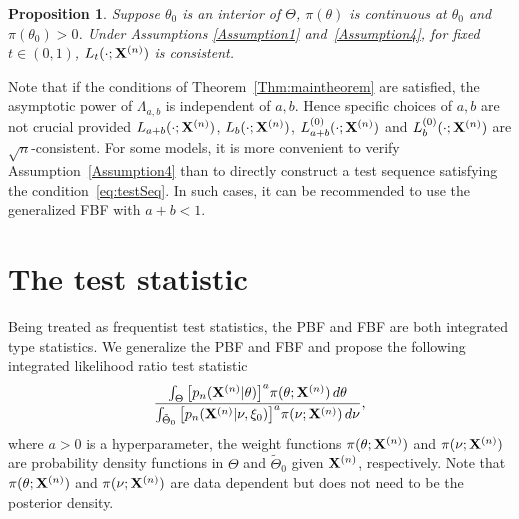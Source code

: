 \documentclass[11pt]{article}
\theoremstyle{plain}
\newtheorem{proposition}{\quad\quad Proposition}
\theoremstyle{definition}
\theoremstyle{remark}
\begin{document}
\begin{proposition}\label{Theoremless1}
    Suppose $\theta_0$ is an interior of $\Theta$, $\pi(\theta)$ is continuous at $\theta_0$ and $\pi(\theta_0)>0$.
    Under Assumptions \ref{Assumption1} and~\ref{Assumption4}, for fixed $t\in(0,1)$, $L_t(\cdot;\mathbf{X}^{(n)})$ is consistent.
\end{proposition}
Note that if the conditions of Theorem~\ref{Thm:maintheorem} are satisfied, the asymptotic power of $\Lambda_{a,b}$ is independent of $a,b$.
Hence specific choices of $a,b$ are not crucial provided $L_{a+b}(\cdot;\mathbf{X}^{(n)})$, $L_b(\cdot;\mathbf{X}^{(n)})$, $L^{(0)}_{a+b}(\cdot;\mathbf{X}^{(n)})$ and $L^{(0)}_b(\cdot;\mathbf{X}^{(n)})$ are $\sqrt{n}$-consistent.
For some models, it is more convenient to verify Assumption~\ref{Assumption4} than to directly construct a test sequence satisfying the condition~\eqref{eq:testSeq}.
In such cases, it can be recommended to use the generalized FBF with $a+b< 1$.




\section{The test statistic}


 Being treated as frequentist test statistics, the PBF and FBF are both integrated type statistics.
 We generalize the PBF and FBF and propose the following integrated likelihood ratio test statistic
\begin{equation*}
    \frac{\int_{\Theta} \big[p_n(\mathbf{X}^{(n)}|\theta)\big]^{a}\pi(\theta;\mathbf{X}^{(n)})\,d\theta}{\int_{\tilde{\Theta}_0} \big[p_n(\mathbf{X}^{(n)}|\nu,\xi_0)\big]^{a}\pi(\nu;\mathbf{X}^{(n)})\,d\nu},
\end{equation*}
where $a>0$ is a hyperparameter,
the weight functions $\pi(\theta;\mathbf{X}^{(n)})$ and $\pi(\nu;\mathbf{X}^{(n)})$ are probability density functions in $\Theta$ and $\tilde{\Theta}_0$ given $\mathbf{X}^{(n)}$, respectively.
Note that $\pi(\theta;\mathbf{X}^{(n)})$ and $\pi(\nu;\mathbf{X}^{(n)})$ are data dependent but does not need to be the posterior density.
\end{document}
